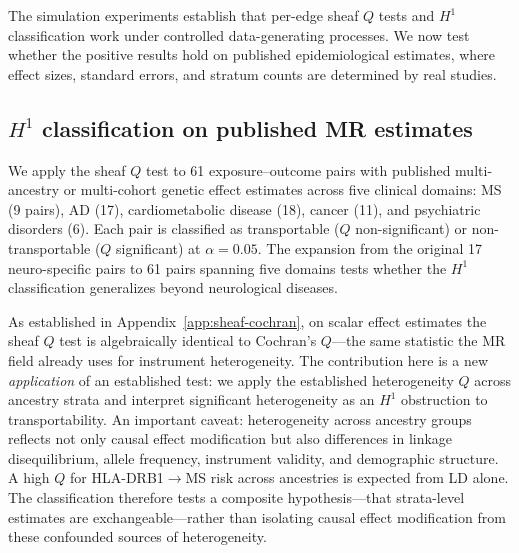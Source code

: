 \documentclass[11pt]{article}
\begin{document}
The simulation experiments establish that per-edge sheaf $Q$ tests and $H^1$ classification work under controlled data-generating processes. We now test whether the positive results hold on published epidemiological estimates, where effect sizes, standard errors, and stratum counts are determined by real studies.

\subsection{$H^1$ classification on published MR estimates}
\label{sec:realdata-h1}

We apply the sheaf $Q$ test to 61 exposure--outcome pairs with published multi-ancestry or multi-cohort genetic effect estimates across five clinical domains: MS (9 pairs), AD (17), cardiometabolic disease (18), cancer (11), and psychiatric disorders (6). Each pair is classified as transportable ($Q$ non-significant) or non-transportable ($Q$ significant) at $\alpha = 0.05$. The expansion from the original 17 neuro-specific pairs to 61 pairs spanning five domains tests whether the $H^1$ classification generalizes beyond neurological diseases.

As established in Appendix~\ref{app:sheaf-cochran}, on scalar effect estimates the sheaf $Q$ test is algebraically identical to Cochran's $Q$---the same statistic the MR field already uses for instrument heterogeneity.
The contribution here is a new \emph{application} of an established test: we apply the established heterogeneity $Q$ across ancestry strata and interpret significant heterogeneity as an $H^1$ obstruction to transportability.
An important caveat: heterogeneity across ancestry groups reflects not only causal effect modification but also differences in linkage disequilibrium, allele frequency, instrument validity, and demographic structure.
A high $Q$ for HLA-DRB1$\to$MS risk across ancestries is expected from LD alone.
The classification therefore tests a composite hypothesis---that strata-level estimates are exchangeable---rather than isolating causal effect modification from these confounded sources of heterogeneity.
\end{document}
